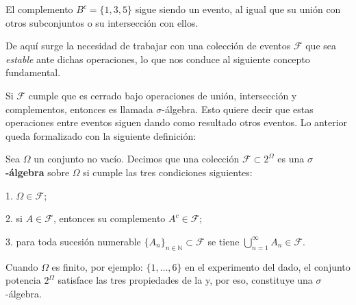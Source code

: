 \documentclass[../Main.tex]{subfiles}
\begin{document}
\begin{remark}
\label{}
    El complemento \(B^{c}=\{1,3,5\}\) sigue siendo un evento, al igual que su unión con otros subconjuntos o su intersección con ellos.  
\end{remark}
De aquí surge la necesidad de trabajar con una colección de eventos \(\mathcal{F}\) que sea \emph{estable} ante dichas operaciones, lo que nos conduce al siguiente concepto fundamental.

Si $\mathcal{F}$ cumple que es cerrado bajo operaciones de unión, intersección y complementos, entonces es llamada $\sigma$-álgebra. Esto quiere decir que estas operaciones entre eventos siguen dando como resultado otros eventos. Lo anterior queda formalizado con la siguiente definición:

\begin{definition}
\label{}
    Sea \(\Omega\) un conjunto no vacío. Decimos que una colección \(\mathcal{F}\subset 2^{\Omega}\) es una \textbf{\(\sigma\)-álgebra} sobre \(\Omega\) si cumple las tres condiciones siguientes:  

1. \(\Omega\in\mathcal{F}\);  

2. si \(A\in\mathcal{F}\), entonces su complemento \(A^{c}\in\mathcal{F}\);  

3. para toda sucesión numerable \(\{A_{n}\}_{n\in\mathbb{N}}\subset\mathcal{F}\) se tiene \(\displaystyle \bigcup_{n=1}^{\infty} A_{n}\in\mathcal{F}\).
\label{def:sigma-alg}
\end{definition}

Cuando \(\Omega\) es finito, por ejemplo: \(\{1,\dots,6\}\) en el experimento del dado, el conjunto potencia \(2^{\Omega}\) satisface las tres propiedades de la  y, por eso, constituye una \(\sigma\)-álgebra.


\end{document}
